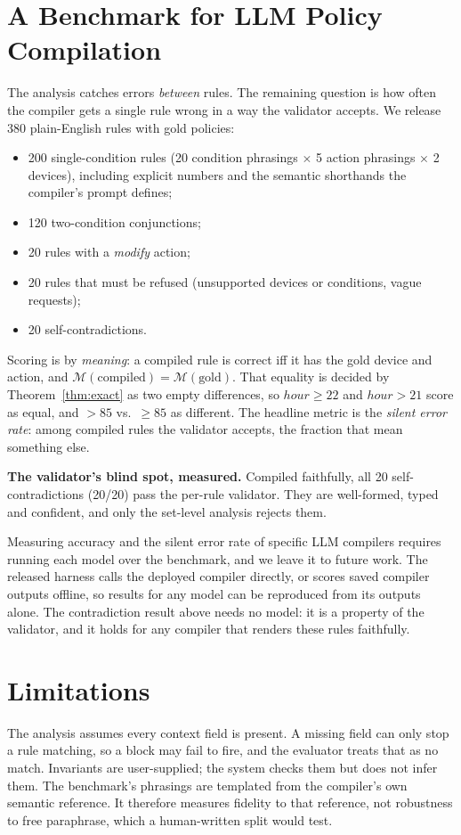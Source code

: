\documentclass[conference]{IEEEtran}
\theoremstyle{definition}
\newcommand{\M}{\mathcal{M}}
\begin{document}
\section{A Benchmark for LLM Policy Compilation}\label{sec:bench}
The analysis catches errors \emph{between} rules. The remaining question is how often the compiler gets a single rule wrong in a way the validator accepts. We release 380 plain-English rules with gold policies:
\begin{itemize}
\item 200 single-condition rules (20 condition phrasings $\times$ 5 action phrasings $\times$ 2 devices), including explicit numbers and the semantic shorthands the compiler's prompt defines;
\item 120 two-condition conjunctions;
\item 20 rules with a \emph{modify} action;
\item 20 rules that must be refused (unsupported devices or conditions, vague requests);
\item 20 self-contradictions.
\end{itemize}
Scoring is by \emph{meaning}: a compiled rule is correct iff it has the gold device and action, and $\M(\text{compiled})=\M(\text{gold})$. That equality is decided by Theorem~\ref{thm:exact} as two empty differences, so $\mathit{hour}\ge22$ and $\mathit{hour}>21$ score as equal, and $>85$ vs.\ $\ge85$ as different. The headline metric is the \emph{silent error rate}: among compiled rules the validator accepts, the fraction that mean something else.

\textbf{The validator's blind spot, measured.} Compiled faithfully, all 20 self-contradictions (20/20) pass the per-rule validator. They are well-formed, typed and confident, and only the set-level analysis rejects them.

Measuring accuracy and the silent error rate of specific LLM compilers requires running each model over the benchmark, and we leave it to future work. The released harness calls the deployed compiler directly, or scores saved compiler outputs offline, so results for any model can be reproduced from its outputs alone. The contradiction result above needs no model: it is a property of the validator, and it holds for any compiler that renders these rules faithfully.

\section{Limitations}
The analysis assumes every context field is present. A missing field can only stop a rule matching, so a block may fail to fire, and the evaluator treats that as no match. Invariants are user-supplied; the system checks them but does not infer them. The benchmark's phrasings are templated from the compiler's own semantic reference. It therefore measures fidelity to that reference, not robustness to free paraphrase, which a human-written split would test.
\end{document}
